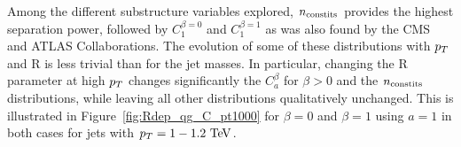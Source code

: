 Among the different substructure variables explored, $n_{\rm constits}$ provides the highest separation
power, followed by $C_1^{\beta=0}$ and $C_1^{\beta=1}$ as was also found by the CMS and ATLAS Collaborations. The evolution of some of these distributions with $p_T$ and R is less trivial than
 for the jet masses. In particular, changing the R parameter at high $p_T$ changes significantly the $C_a^{\beta}$
for $\beta>0$ and the $n_{\rm constits}$ distributions, while leaving all other distributions qualitatively unchanged. 
This is illustrated in Figure~\ref{fig:Rdep_qg_C_pt1000} for $\beta=0$ and $\beta=1$ using $a=1$ in both cases for
jets with $\pt=1-1.2\TeV$. 
\begin{figure}
\begin{center}
\\

\end{center}
\end{figure}
